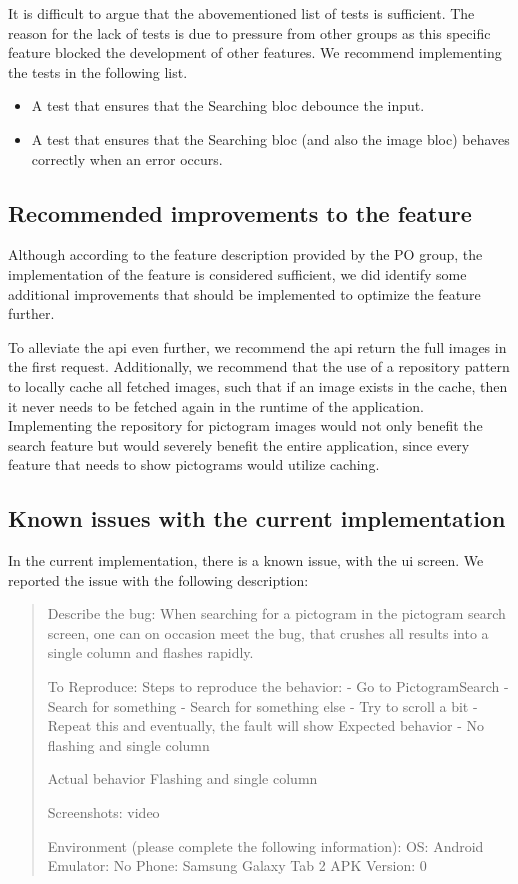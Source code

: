 It is difficult to argue that the abovementioned list of tests is sufficient. The reason for the lack of tests is due to pressure from other groups as this specific feature blocked the development of other features. We recommend implementing the tests in the following list. 

\begin{itemize}
  \item A test that ensures that the Searching \gls{bloc} debounce the input.
  \item A test that ensures that the Searching \gls{bloc} (and also the image \gls{bloc}) behaves correctly when an error occurs.
\end{itemize}

\subsection{Recommended improvements to the feature}
Although according to the feature description provided by the \gls{PO} group, the implementation of the feature is considered sufficient, we did identify some additional improvements that should be implemented to optimize the feature further. 

To alleviate the \gls{api} even further, we recommend the \gls{api} return the full images in the first request. Additionally, we recommend that the use of a repository pattern to locally cache all fetched images, such that if an image exists in the cache, then it never needs to be fetched again in the runtime of the application. Implementing the repository for pictogram images would not only benefit the search feature but would severely benefit the entire application, since every feature that needs to show pictograms would utilize caching.

\subsection{Known issues with the current implementation}
In the current implementation, there is a known issue, with the \gls{ui} screen. We reported the issue with the following description:

\begin{quote}
Describe the bug:
When searching for a pictogram in the pictogram search screen, one can on occasion meet the bug, that crushes all results into a single column and flashes rapidly.

To Reproduce:
Steps to reproduce the behavior:
- Go to PictogramSearch
- Search for something
- Search for something else
- Try to scroll a bit
- Repeat this and eventually, the fault will show Expected behavior
- No flashing and single column

Actual behavior
Flashing and single column

Screenshots:
video

Environment (please complete the following information):
OS: Android
Emulator: No
Phone: Samsung Galaxy Tab 2
APK Version: 0
\end{quote}
